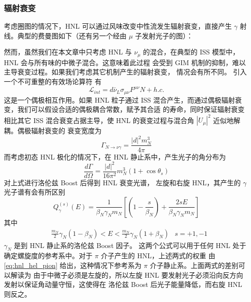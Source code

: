 \documentclass[UTF8]{ctexart}
\begin{document}
\subsubsection{辐射衰变}
考虑圈图的情况下，HNL 可以通过风味改变中性流发生辐射衰变，直接产生 $\gamma$ 射线。典型的费曼图如下（还有另一个经由 $\mu$ 子发射光子的图）：
\begin{center}
\end{center}
然而，虽然我们在本文章中只考虑 HNL 与 $\nu_\mu$ 的混合，在典型的 ISS 模型中，HNL 会与所有味的中微子混合。这意味着此过程
会受到 GIM 机制的抑制，难以主导衰变过程。如果我们考虑其它机制产生的辐射衰变，
情况会有所不同。
引入一个不可重整的有效场论算符 \cite{Magill_2018} 有
\begin{equation}
  \mathcal{L}_{int} = d \bar{\nu}_L \sigma_{\mu \nu} F^{\mu \nu} N + h.c. \label{eq:int_mag_nu}
\end{equation}
这是一个偶极相互作用。如果 HNL 粒子通过 ISS 混合产生，而通过偶极辐射衰变，我们可以假设合适的偶极耦合常数，赋予其合适
的寿命，同时保证辐射衰变相比其它 ISS 混合衰变占据主导，使 HNL 的衰变过程与混合角 $|U_\mu|^2$ 近似地解耦。偶极辐射衰变的
衰变宽度为 \cite{Magill_2018}
\begin{equation}
  \Gamma_{N \to \nu \gamma} = \frac{|d|^2 m_N^3}{4 \pi}
\end{equation}
而考虑初态 HNL 极化的情况下，在 HNL 静止系中，产生光子的角分布为
\begin{equation}
  \frac{d \Gamma}{d \Omega} = \frac{|d|^2}{16 \pi^2} m_N^3 (1 + \cos{\theta_{s}})
\end{equation}
对上式进行洛伦兹 Boost 后得到 HNL 衰变光谱，
左旋和右旋 HNL，其产生的 $\gamma$ 光子谱有会有所区别
\begin{equation}
  Q_\gamma^{(s)} (E) = \frac{1}{\beta_N \gamma_N m_N} \left[ \left( 1 - \frac{s}{\beta_N}\right) + \frac{2 s E}{\beta_N \gamma_N m_N} \right]
\end{equation}
其中 
\begin{align*}
  &\frac{m_N}{2} \gamma_N (1 - \beta_N) < E < \frac{m_N}{2} \gamma_N (1 + \beta_N)
  &s = +1,-1
\end{align*}
$\gamma_N$ 是到 HNL 静止系的洛伦兹 Boost 因子。
这两个公式可以用于任何 HNL 处于确定螺旋度的参考系中。对于 $\pi$ 介子产生的 HNL，上述两式的权重
由 \ref{eq:hnl_hel_pion} 给出，这种情况下参考系为 $\pi$ 介子静止系。上面两式的差别可以解读为
由于中微子必须是左旋的，所以左旋 HNL 要发射光子必须沿向反方向发射以保证角动量守恒，这使得在
洛伦兹 Boost 后光子能量降低，而右旋 HNL 则反之。
\end{document}
